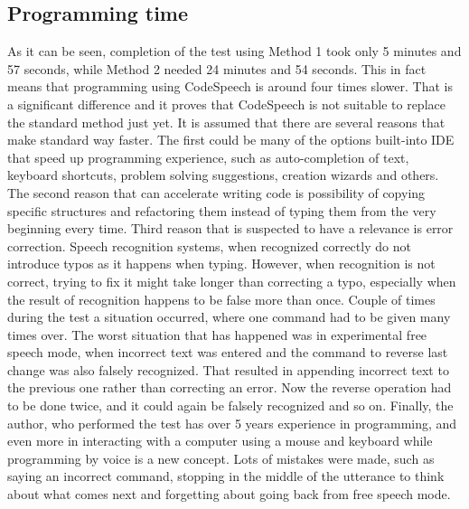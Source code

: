 \subsection{Programming time}

As it can be seen, completion of the test using Method 1 took only 5 minutes and 57 seconds, while Method 2 needed 24 minutes and 54 seconds. This in fact means that programming using CodeSpeech is around four times slower. That is a significant difference and it proves that CodeSpeech is not suitable to replace the standard method just yet. It is assumed that there are several reasons that make standard way faster. The first could be many of the options built-into IDE that speed up programming experience, such as auto-completion of text, keyboard shortcuts, problem solving suggestions, creation wizards and others. The second reason that can accelerate writing code is possibility of copying specific structures and refactoring them instead of typing them from the very beginning every time. Third reason that is suspected to have a relevance is error correction. Speech recognition systems, when recognized correctly do not introduce typos as it happens when typing. However, when recognition is not correct, trying to fix it might take longer than correcting a typo, especially when the result of recognition happens to be false more than once. Couple of times during the test a situation occurred, where one command had to be given many times over. The worst situation that has happened was in experimental free speech mode, when incorrect text was entered and the command to reverse last change was also falsely recognized. That resulted in appending incorrect text to the previous one rather than correcting an error. Now the reverse operation had to be done twice, and it could again be falsely recognized and so on. Finally, the author, who performed the test has over 5 years experience in programming, and even more in interacting with a computer using a mouse and keyboard while programming by voice is a new concept. Lots of mistakes were made, such as saying an incorrect command, stopping in the middle of the utterance to think about what comes next and forgetting about going back from free speech mode. 

